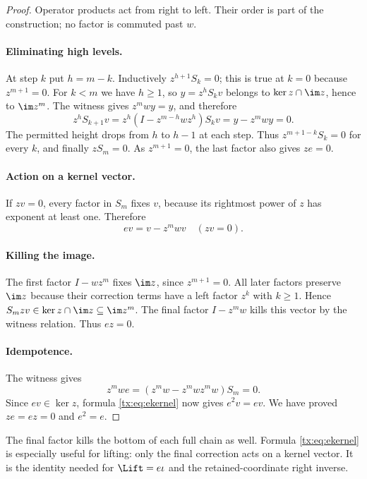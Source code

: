 \begin{proof}
Operator products act from right to left. Their order is part of the
construction; no factor is commuted past $w$.

\paragraph{Eliminating high levels.}
At step $k$ put $h=m-k$. Inductively $z^{h+1}S_k=0$; this is
true at $k=0$ because $z^{m+1}=0$. For $k<m$ we have $h\ge1$, so
$y=z^hS_kv$ belongs to $\ker z\cap\im z$, hence to $\im z^m$.
The witness gives $z^mwy=y$, and therefore
\[
 z^hS_{k+1}v
       =z^h(I-z^{m-h}wz^h)S_kv=y-z^mwy=0.
\]
The permitted height drops from $h$ to $h-1$ at each step. Thus
$z^{m+1-k}S_k=0$ for every $k$, and finally $zS_m=0$.
As $z^{m+1}=0$, the last factor also gives $ze=0$.

\paragraph{Action on a kernel vector.}
If $zv=0$, every factor in $S_m$ fixes $v$, because its rightmost power of $z$ has exponent at least one. Therefore
\begin{equation}\label{tx:eq:ekernel}ev=v-z^mwv\quad(zv=0).
\end{equation}

\paragraph{Killing the image.}
The first factor $I-wz^m$ fixes $\im z$, since $z^{m+1}=0$. All later factors preserve $\im z$ because their correction terms have a left factor $z^k$ with $k\ge1$. Hence $S_mzv\in\ker z\cap\im z\subseteq\im z^m$. The final factor $I-z^mw$ kills this vector by the witness relation. Thus $ez=0$.

\paragraph{Idempotence.}
The witness gives
\[z^mwe=(z^mw-z^mwz^mw)S_m=0.
\]
Since $ev\in\ker z$, formula \eqref{tx:eq:ekernel} now gives $e^2v=ev$. We have proved $ze=ez=0$ and $e^2=e$.
\end{proof}

The final factor kills the bottom of each full chain as well.
Formula \eqref{tx:eq:ekernel} is especially useful for lifting:
only the final correction acts on a kernel vector. It is the identity needed for
$\Lift=e\iota$ and the retained-coordinate right inverse.

